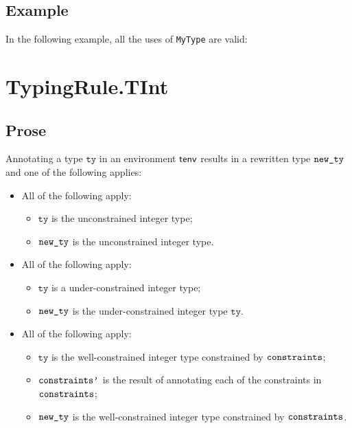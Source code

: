 \documentclass{book}
\newcommand\tty[0]{\texttt{ty}}
\begin{document}
\subsection{Example}
In the following example, all the uses of \texttt{MyType} are valid:






\section{TypingRule.TInt \label{sec:TypingRule.TInt}}

\subsection{Prose}
Annotating a type $\tty$ in an environment $\textsf{tenv}$ results in a
rewritten type $\texttt{new\_ty}$ and one of the following applies:
\begin{itemize}
  \item All of the following apply:
    \begin{itemize}
      \item $\tty$ is the unconstrained integer type;
      \item $\texttt{new\_ty}$ is the unconstrained integer type.
    \end{itemize}
  \item All of the following apply:
    \begin{itemize}
      \item $\tty$ is a under-constrained integer type;
      \item $\texttt{new\_ty}$ is the under-constrained integer type $\tty$.
    \end{itemize}
  \item All of the following apply:
    \begin{itemize}
      \item $\tty$ is the well-constrained integer type constrained by
        $\texttt{constraints}$;
      \item $\texttt{constraints'}$ is the result of annotating each of the
        constraints in $\texttt{constraints}$;
      \item $\texttt{new\_ty}$ is the well-constrained integer type constrained
        by $\texttt{constraints}$.
    \end{itemize}
\end{itemize}
\end{document}
